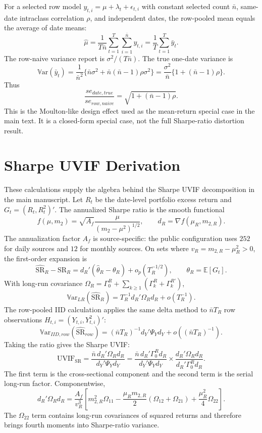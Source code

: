\documentclass[12pt,a4paper]{article}
\newcommand{\E}{\mathbb{E}}
\newcommand{\Var}{\mathbb{V}\mathrm{ar}}
\newcommand{\SR}{\mathrm{SR}}
\newcommand{\UVIF}{\mathrm{UVIF}}
\begin{document}
For a selected row model \(y_{t,i}=\mu+\lambda_t+\epsilon_{t,i}\) with
constant selected count \(\bar n\), same-date intraclass correlation
\(\rho\), and independent dates, the row-pooled mean equals the average
of date means:
\[
  \hat\mu =
  \frac{1}{T\bar n}\sum_{t=1}^{T}\sum_{i=1}^{\bar n} y_{t,i}
  =
  \frac{1}{T}\sum_{t=1}^{T}\bar y_t .
\]
The row-naive variance report is \(\sigma^2/(T\bar n)\).  The true
one-date variance is
\[
  \Var(\bar y_t)
  =
  \frac{1}{\bar n^2}
  \{\bar n\sigma^2+\bar n(\bar n-1)\rho\sigma^2\}
  =
  \frac{\sigma^2}{\bar n}\{1+(\bar n-1)\rho\}.
\]
Thus
\[
  \frac{se_{date,true}}{se_{row,naive}}
  =
  \sqrt{1+(\bar n-1)\rho}.
\]
This is the Moulton-like design effect used as the mean-return special
case in the main text.  It is a closed-form special case, not the full
Sharpe-ratio distortion result.

\section{Sharpe UVIF Derivation}

These calculations supply the algebra behind the Sharpe UVIF
decomposition in the main manuscript.
Let \(R_t\) be the date-level portfolio excess return and
\(G_t=(R_t,R_t^2)'\).  The annualized Sharpe ratio is the smooth
functional
\[
  f(\mu,m_2)=\sqrt{A_f}\frac{\mu}{(m_2-\mu^2)^{1/2}},
  \qquad
  d_R=\nabla f(\mu_R,m_{2,R}).
\]
The annualization factor \(A_f\) is source-specific: the public configuration
uses \(252\) for daily sources and \(12\) for monthly sources.
On sets where \(v_R=m_{2,R}-\mu_R^2>0\), the first-order expansion is
\[
  \widehat{\SR}_R-\SR_R
  =
  d_R'(\hat\theta_R-\theta_R)+o_p(T_R^{-1/2}),
  \qquad \theta_R=\E[G_t].
\]
With long-run covariance
\(\Omega_R=\Gamma_0^R+\sum_{k\ge1}(\Gamma_k^R+\Gamma_k^{R\prime})\),
\[
  \Var_{LR}(\widehat{\SR}_R)
  =
  T_R^{-1}d_R'\Omega_Rd_R+o(T_R^{-1}).
\]
The row-pooled IID calculation applies the same delta method to
\(\bar nT_R\) row observations \(H_{t,i}=(Y_{t,i},Y_{t,i}^2)'\):
\[
  \Var_{IID,row}(\widehat{\SR}_{row})
  =
  (\bar nT_R)^{-1}d_Y'\Psi_Yd_Y+o((\bar nT_R)^{-1}).
\]
Taking the ratio gives the Sharpe UVIF:
\[
  \UVIF_{\SR}
  =
  \frac{\bar n\,d_R'\Omega_Rd_R}{d_Y'\Psi_Yd_Y}
  =
  \frac{\bar n\,d_R'\Gamma_0^Rd_R}{d_Y'\Psi_Yd_Y}
  \times
  \frac{d_R'\Omega_Rd_R}{d_R'\Gamma_0^Rd_R}.
\]
The first term is the cross-sectional component and the second term is
the serial long-run factor.  Componentwise,
\[
  d_R'\Omega_Rd_R
  =
  \frac{A_f}{v_R^3}
  \left[
    m_{2,R}^2\Omega_{11}
    -\frac{\mu_Rm_{2,R}}{2}(\Omega_{12}+\Omega_{21})
    +\frac{\mu_R^2}{4}\Omega_{22}
  \right].
\]
The \(\Omega_{22}\) term contains long-run covariances of squared
returns and therefore brings fourth moments into Sharpe-ratio variance.
\end{document}
